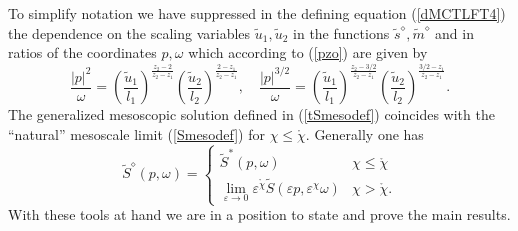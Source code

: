 \documentclass[12pt]{article}
\begin{document}
To simplify notation we have suppressed in the defining equation 
(\ref{dMCTLFT4}) the dependence on the scaling
variables $\tilde{u}_1,\tilde{u}_2$ in the functions
$\tilde{s}^{\diamond},\tilde{m}^{\diamond}$
and in ratios of the coordinates $p,\omega$ which according to
(\ref{pzo}) are given by
\begin{equation}
\frac{|p|^2}{\omega} = 
\left(\frac{\tilde{u}_1}{l_1}
\right)^{\frac{z_2-2}{z_2-z_1}}
\left(\frac{\tilde{u}_2}{l_2} \right)^{\frac{2-z_1}{z_2-z_1}}, \quad
\frac{|p|^{3/2}}{\omega} = 
\left(\frac{\tilde{u}_1}{l_1}
\right)^{\frac{z_2-3/2}{z_2-z_1}}
\left(\frac{\tilde{u}_2}{l_2} \right)^{\frac{3/2-z_1}{z_2-z_1}}.
\label{pzo2}
\end{equation}
The generalized mesoscopic 
solution defined in (\ref{tSmesodef}) coincides with the ``natural''
mesoscale limit (\ref{Smesodef}) for $\chi\leq \mathring{\chi}$.
Generally one has
\begin{equation}
\tilde{S}^{\diamond}(p,\omega) = 
\left\{\begin{array}{ll}
\tilde{S}^\ast(p,\omega) & \chi\leq \mathring{\chi} \\
\lim_{\varepsilon \to 0} \varepsilon^{\mathring{\chi}} 
\tilde{S}(\varepsilon p, \varepsilon^{\chi} \omega) & \chi > \mathring{\chi}.
\end{array}\right.
\end{equation}
With these tools at hand we are in a position to state and prove the main results.
\end{document}
